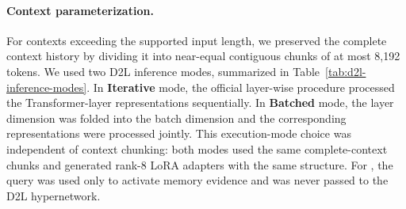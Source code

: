 \paragraph{Context parameterization.}
For contexts exceeding the supported input length, we preserved the complete context history by dividing it into near-equal contiguous chunks of at most 8,192 tokens. We used two D2L inference modes, summarized in Table~\ref{tab:d2l-inference-modes}. In \textbf{Iterative} mode, the official layer-wise procedure processed the Transformer-layer representations sequentially. In \textbf{Batched} mode, the layer dimension was folded into the batch dimension and the corresponding representations were processed jointly. This execution-mode choice was independent of context chunking: both modes used the same complete-context chunks and generated rank-8 LoRA adapters with the same structure. For \method{}, the query was used only to activate memory evidence and was never passed to the D2L hypernetwork.

\begin{table}[tb]
\centering
\small
{}
\caption{\textbf{D2L inference modes for context parameterization.} Iterative and batched execution differ only in how Transformer-layer representations are processed; both retain complete-context chunking and use the same adapter configuration.}
\label{tab:d2l-inference-modes}
\end{table}

